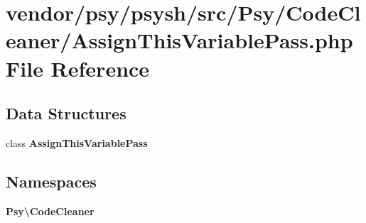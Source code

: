 \section{vendor/psy/psysh/src/\+Psy/\+Code\+Cleaner/\+Assign\+This\+Variable\+Pass.php File Reference}
\label{_assign_this_variable_pass_8php}
\subsection*{Data Structures}
\begin{DoxyCompactItemize}
\item 
class {\bf Assign\+This\+Variable\+Pass}
\end{DoxyCompactItemize}
\subsection*{Namespaces}
\begin{DoxyCompactItemize}
\item 
 {\bf Psy\textbackslash{}\+Code\+Cleaner}
\end{DoxyCompactItemize}

